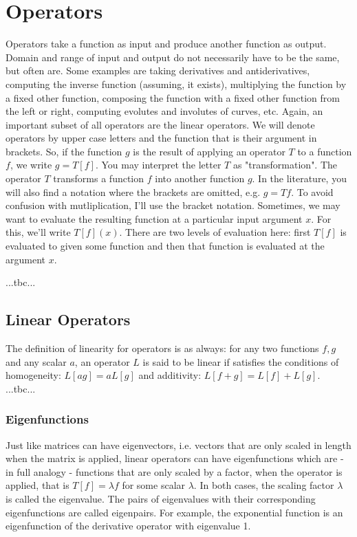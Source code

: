 \section{Operators}
Operators take a function as input and produce another function as output. Domain and range of input and output do not necessarily have to be the same, but often are. Some examples are taking derivatives and antiderivatives, computing the inverse function (assuming, it exists), multiplying the function by a fixed other function, composing the function with a fixed other function from the left or right, computing evolutes and involutes of curves, etc. Again, an important subset of all operators are the linear operators. We will denote operators by upper case letters and the function that is their argument in brackets. So, if the function $g$ is the result of applying an operator $T$ to a function $f$, we write $g = T[f]$. You may interpret the letter $T$ as "transformation". The operator $T$ transforms a function $f$ into another function $g$. In the literature, you will also find a notation where the brackets are omitted, e.g. $g = T f$. To avoid confusion with mutliplication, I'll use the bracket notation. Sometimes, we may want to evaluate the resulting function at a particular input argument $x$. For this, we'll write $T[f](x)$. There are two levels of evaluation here: first $T[f]$ is evaluated to given some function and then that function is evaluated at the argument $x$.

...tbc...



\subsection{Linear Operators}
The definition of linearity for operators is as always: for any two functions $f,g$ and any scalar $a$, an operator $L$ is said to be linear if satisfies the conditions of homogeneity: $L[a g] = a L[g]$ and additivity: $L[f+g] = L[f] + L[g]$. ...tbc...


\subsubsection{Eigenfunctions}
Just like matrices can have eigenvectors, i.e. vectors that are only scaled in length when the matrix is applied, linear operators can have eigenfunctions which are - in full analogy - functions that are only scaled by a factor, when the operator is applied, that is $T[f] = \lambda f$ for some scalar $\lambda$. In both cases, the scaling factor $\lambda$ is called the eigenvalue. The pairs of eigenvalues with their corresponding eigenfunctions are called eigenpairs. For example, the exponential function is an eigenfunction of the derivative operator with eigenvalue 1.


